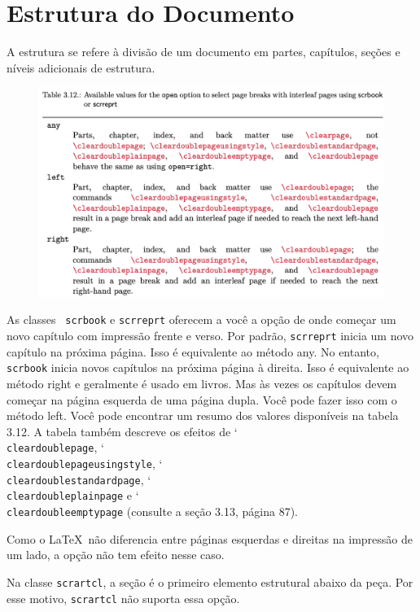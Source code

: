 \chapter{Estrutura do Documento}
A estrutura se refere à divisão de um documento em partes, capítulos, seções e níveis adicionais de estrutura.
\begin{figure}[h]
    \centering
    \includegraphics[width=0.80\linewidth]{imagens/imagem17.png}
    \label{fig:3_12}
\end{figure}

As classes \KOMAScript\ \texttt{scrbook} e \texttt{scrreprt} oferecem a você a opção de onde começar um novo capítulo com impressão frente e verso. Por padrão, \texttt{scrreprt} inicia um novo capítulo na próxima página. Isso é equivalente ao método any. No entanto, \texttt{scrbook} inicia novos capítulos na próxima página à direita. Isso é equivalente ao método right e geralmente é usado em livros. Mas às vezes os capítulos devem começar na página esquerda de uma página dupla. Você pode fazer isso com o método left. Você pode encontrar um resumo dos valores disponíveis na tabela 3.12. A tabela também descreve os efeitos de \char`\\\texttt{clear\-dou\-ble\-pa\-ge}, \char`\\\texttt{clear\-dou\-ble\-pa\-ge\-u\-sing\-sty\-le}, \char`\\\texttt{clear\-dou\-ble\-stan\-dard\-pa\-ge}, \char`\\\texttt{clear\-dou\-ble\-plain\-pa\-ge} e \char`\\\texttt{clear\-dou\-ble\-empty\-pa\-ge} (consulte a seção 3.13, página 87).

Como o \LaTeX\ não diferencia entre páginas esquerdas e direitas na impressão de um lado, a opção não tem efeito nesse caso.

Na classe \texttt{scrartcl}, a seção é o primeiro elemento estrutural abaixo da peça. Por esse motivo, \texttt{scrartcl} não suporta essa opção.

